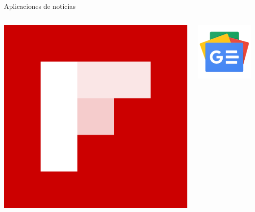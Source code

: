 \documentclass[12pt]{beamer}
\begin{document}
\begin{frame}{Aplicaciones de noticias}
\begin{columns}[onlytextwidth]
\begin{column}{0.3\textwidth}
					\includegraphics[width=\textwidth,height=0.8\textheight,keepaspectratio]{img/alternativas/flipboard_logo}
				\end{column}
				\begin{column}{0.3\textwidth}
					\includegraphics[width=\textwidth,height=0.8\textheight,keepaspectratio]{img/alternativas/gnews_logo}
				\end{column}
			\end{columns}
		\end{frame}
\end{document}
